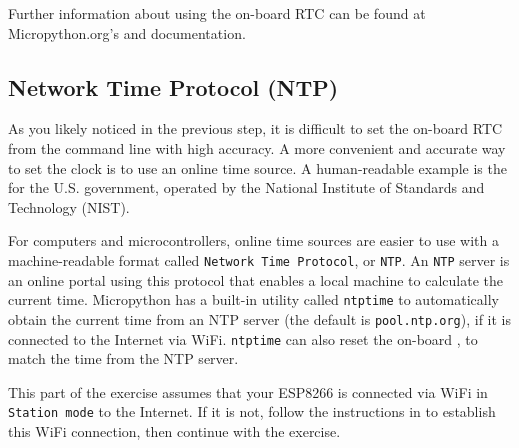 Further information about using the on-board RTC can be found at Micropython.org's  and
 documentation.

\subsection{Network Time Protocol (NTP)}
As you likely noticed in the previous step, it is difficult to set the on-board RTC from the command line with high accuracy. 
A more convenient and accurate way to set the clock is to use an online time source.
A human-readable example is the  for the U.S. government, operated by the National Institute of Standards and Technology (NIST).

For computers and microcontrollers, online time sources are easier to use with a machine-readable format called  
 \texttt{Network Time Protocol}, or \texttt{NTP}. 
An \texttt{NTP} server is an online portal using this protocol that enables a local machine to calculate the current time.  
Micropython has a built-in utility called \lstinline{ntptime} to automatically obtain the current time from an NTP server (the default is \texttt{pool.ntp.org}), if it is connected to the Internet via WiFi. 
\lstinline{ntptime} can also reset the on-board \rtc, to match the time from the NTP server. 

	This part of the exercise assumes that your ESP8266 is connected via WiFi in \texttt{Station mode} to the Internet. If it is not, follow the instructions in  to establish this WiFi connection, then continue with the exercise.

